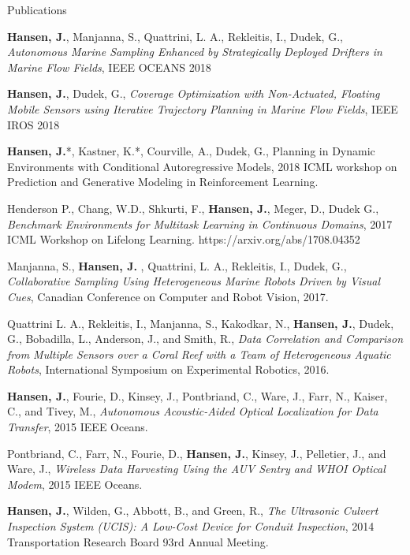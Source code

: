 \documentclass{resume} %
\begin{document}
\begin{rSection}{Publications}

\textbf{Hansen, J.}, Manjanna, S.,  Quattrini, L. A., Rekleitis, I., Dudek, G., \textit{Autonomous Marine Sampling Enhanced by Strategically Deployed Drifters in Marine Flow Fields}, IEEE OCEANS 2018

\textbf{Hansen, J.}, Dudek, G., \textit{Coverage Optimization with Non-Actuated, Floating Mobile Sensors using Iterative Trajectory Planning in Marine Flow Fields}, IEEE IROS 2018

\textbf{Hansen, J.}*, Kastner, K.*, Courville, A., Dudek, G.,  Planning in Dynamic Environments with Conditional Autoregressive Models, 2018 ICML workshop on Prediction and Generative Modeling in Reinforcement Learning.  

Henderson P., Chang, W.D., Shkurti, F., \textbf{Hansen, J.}, Meger, D., Dudek G., 
\textit{Benchmark Environments for Multitask Learning in Continuous Domains}, 2017 ICML Workshop on Lifelong Learning. https://arxiv.org/abs/1708.04352 

Manjanna, S., \textbf{ Hansen, J. }, Quattrini, L. A., Rekleitis, I., Dudek, G., 
\textit{Collaborative Sampling Using Heterogeneous Marine Robots Driven by Visual Cues}, Canadian Conference on Computer and Robot Vision, 2017. 
                
Quattrini L. A., Rekleitis, I., Manjanna, S., Kakodkar, N., \textbf{Hansen, J.},   Dudek, G.,  Bobadilla, L.,  Anderson, J., and Smith, R.,
            \textit{Data Correlation and Comparison from Multiple Sensors over a Coral Reef with a Team of Heterogeneous Aquatic Robots},
             International Symposium on Experimental Robotics,
              2016.

\textbf{Hansen, J.}, Fourie, D., Kinsey, J., Pontbriand, C., Ware, J., Farr, N., Kaiser, C., and Tivey, M., \textit{Autonomous Acoustic-Aided Optical Localization for Data Transfer}, 2015 IEEE Oceans.

Pontbriand, C., Farr, N., Fourie, D., \textbf{Hansen, J.},  Kinsey, J., Pelletier, J., and Ware, J., 
 \textit{Wireless Data Harvesting Using the AUV Sentry and WHOI Optical Modem}, 2015 IEEE Oceans.

\textbf{Hansen, J.}, Wilden, G., Abbott, B., and Green, R., \textit{The Ultrasonic Culvert
Inspection System (UCIS): A Low-Cost Device for Conduit Inspection}, 2014 Transportation
Research Board 93rd Annual Meeting. 
\end{rSection}
\newpage
\end{document}
